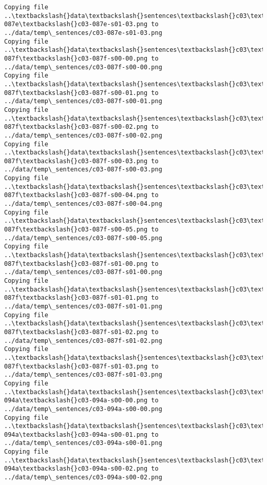 \documentclass[11pt]{article}
\begin{document}
\begin{Verbatim}[commandchars=\\\{\}]
Copying file ..\textbackslash{}data\textbackslash{}sentences\textbackslash{}c03\textbackslash{}c03-087e\textbackslash{}c03-087e-s01-03.png to
../data/temp\_sentences/c03-087e-s01-03.png
Copying file ..\textbackslash{}data\textbackslash{}sentences\textbackslash{}c03\textbackslash{}c03-087f\textbackslash{}c03-087f-s00-00.png to
../data/temp\_sentences/c03-087f-s00-00.png
Copying file ..\textbackslash{}data\textbackslash{}sentences\textbackslash{}c03\textbackslash{}c03-087f\textbackslash{}c03-087f-s00-01.png to
../data/temp\_sentences/c03-087f-s00-01.png
Copying file ..\textbackslash{}data\textbackslash{}sentences\textbackslash{}c03\textbackslash{}c03-087f\textbackslash{}c03-087f-s00-02.png to
../data/temp\_sentences/c03-087f-s00-02.png
Copying file ..\textbackslash{}data\textbackslash{}sentences\textbackslash{}c03\textbackslash{}c03-087f\textbackslash{}c03-087f-s00-03.png to
../data/temp\_sentences/c03-087f-s00-03.png
Copying file ..\textbackslash{}data\textbackslash{}sentences\textbackslash{}c03\textbackslash{}c03-087f\textbackslash{}c03-087f-s00-04.png to
../data/temp\_sentences/c03-087f-s00-04.png
Copying file ..\textbackslash{}data\textbackslash{}sentences\textbackslash{}c03\textbackslash{}c03-087f\textbackslash{}c03-087f-s00-05.png to
../data/temp\_sentences/c03-087f-s00-05.png
Copying file ..\textbackslash{}data\textbackslash{}sentences\textbackslash{}c03\textbackslash{}c03-087f\textbackslash{}c03-087f-s01-00.png to
../data/temp\_sentences/c03-087f-s01-00.png
Copying file ..\textbackslash{}data\textbackslash{}sentences\textbackslash{}c03\textbackslash{}c03-087f\textbackslash{}c03-087f-s01-01.png to
../data/temp\_sentences/c03-087f-s01-01.png
Copying file ..\textbackslash{}data\textbackslash{}sentences\textbackslash{}c03\textbackslash{}c03-087f\textbackslash{}c03-087f-s01-02.png to
../data/temp\_sentences/c03-087f-s01-02.png
Copying file ..\textbackslash{}data\textbackslash{}sentences\textbackslash{}c03\textbackslash{}c03-087f\textbackslash{}c03-087f-s01-03.png to
../data/temp\_sentences/c03-087f-s01-03.png
Copying file ..\textbackslash{}data\textbackslash{}sentences\textbackslash{}c03\textbackslash{}c03-094a\textbackslash{}c03-094a-s00-00.png to
../data/temp\_sentences/c03-094a-s00-00.png
Copying file ..\textbackslash{}data\textbackslash{}sentences\textbackslash{}c03\textbackslash{}c03-094a\textbackslash{}c03-094a-s00-01.png to
../data/temp\_sentences/c03-094a-s00-01.png
Copying file ..\textbackslash{}data\textbackslash{}sentences\textbackslash{}c03\textbackslash{}c03-094a\textbackslash{}c03-094a-s00-02.png to
../data/temp\_sentences/c03-094a-s00-02.png

\end{Verbatim}
\end{document}
